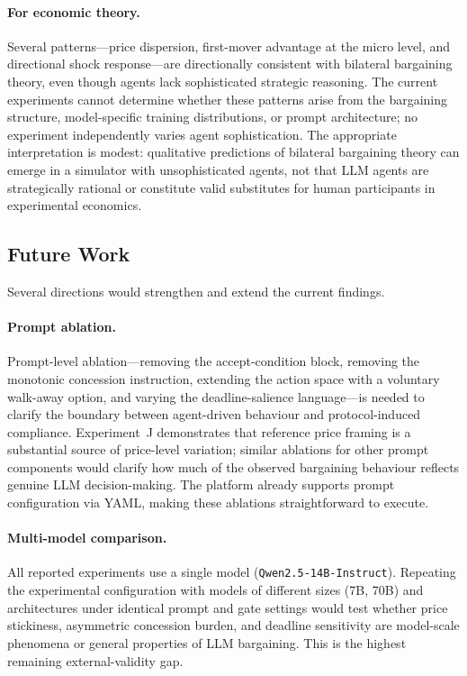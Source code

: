 \paragraph{For economic theory.}
Several patterns---price dispersion, first-mover advantage at the micro level, and directional shock response---are directionally consistent with bilateral bargaining theory, even though agents lack sophisticated strategic reasoning.  The current experiments cannot determine whether these patterns arise from the bargaining structure, model-specific training distributions, or prompt architecture; no experiment independently varies agent sophistication.  The appropriate interpretation is modest: qualitative predictions of bilateral bargaining theory can emerge in a simulator with unsophisticated agents, not that LLM agents are strategically rational or constitute valid substitutes for human participants in experimental economics.

\subsection{Future Work}

Several directions would strengthen and extend the current findings.

\paragraph{Prompt ablation.}
Prompt-level ablation---removing the accept-condition block, removing the monotonic concession instruction, extending the action space with a voluntary walk-away option, and varying the deadline-salience language---is needed to clarify the boundary between agent-driven behaviour and protocol-induced compliance.  Experiment~J demonstrates that reference price framing is a substantial source of price-level variation; similar ablations for other prompt components would clarify how much of the observed bargaining behaviour reflects genuine LLM decision-making.  The platform already supports prompt configuration via YAML, making these ablations straightforward to execute.

\paragraph{Multi-model comparison.}
All reported experiments use a single model (\texttt{Qwen2.5-14B-Instruct}).  Repeating the experimental configuration with models of different sizes (7B, 70B) and architectures under identical prompt and gate settings would test whether price stickiness, asymmetric concession burden, and deadline sensitivity are model-scale phenomena or general properties of LLM bargaining.  This is the highest remaining external-validity gap.

